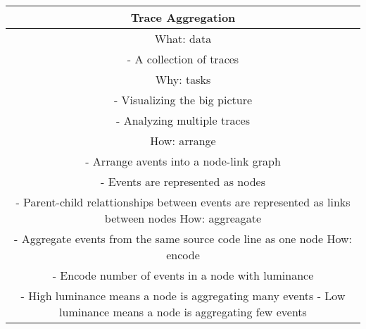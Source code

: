 \begin{center}
    \begin{tabular}{ |c| }
        \hline
        Trace Aggregation  \\
        \hline
        What: data \\
         - A collection of traces \\
        \hline
        Why: tasks \\
         - Visualizing the big picture \\
         - Analyzing multiple traces \\
        \hline
        How: arrange \\
         - Arrange avents into a node-link graph \\
         - Events are represented as nodes \\
         - Parent-child relattionships between events are represented as links between nodes
         How: aggreagate \\
         - Aggregate events from the same source code line as one node
         How: encode \\
          - Encode number of events in a node with luminance \\
          - High luminance means a node is aggregating many events
          - Low luminance means a node is aggregating few events
    \end{tabular}
\end{center}
